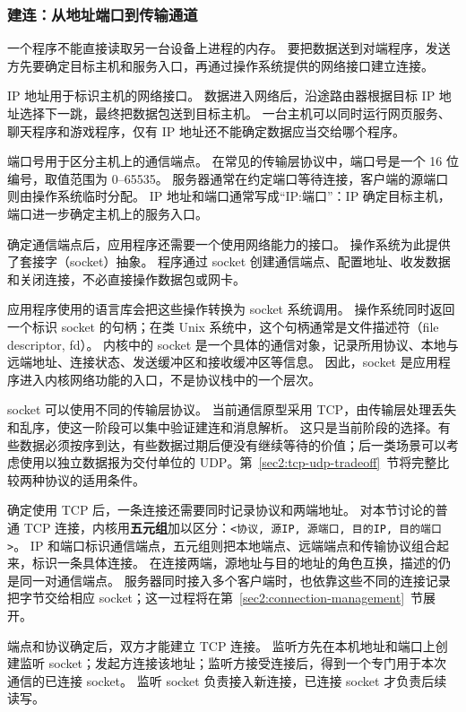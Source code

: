 \subsubsection{建连：从地址端口到传输通道}\label{sec2:connect-channel}

一个程序不能直接读取另一台设备上进程的内存。
要把数据送到对端程序，发送方先要确定目标主机和服务入口，再通过操作系统提供的网络接口建立连接。

IP 地址用于标识主机的网络接口。
数据进入网络后，沿途路由器根据目标 IP 地址选择下一跳，最终把数据包送到目标主机。
一台主机可以同时运行网页服务、聊天程序和游戏程序，仅有 IP 地址还不能确定数据应当交给哪个程序。

端口号用于区分主机上的通信端点。
在常见的传输层协议中，端口号是一个 16 位编号，取值范围为 0--65535。
服务器通常在约定端口等待连接，客户端的源端口则由操作系统临时分配。
IP 地址和端口通常写成“IP:端口”：IP 确定目标主机，端口进一步确定主机上的服务入口。

确定通信端点后，应用程序还需要一个使用网络能力的接口。
操作系统为此提供了套接字（socket）抽象。
程序通过 socket 创建通信端点、配置地址、收发数据和关闭连接，不必直接操作数据包或网卡。

应用程序使用的语言库会把这些操作转换为 socket 系统调用。
操作系统同时返回一个标识 socket 的句柄；在类 Unix 系统中，这个句柄通常是文件描述符（file descriptor, fd）。
内核中的 socket 是一个具体的通信对象，记录所用协议、本地与远端地址、连接状态、发送缓冲区和接收缓冲区等信息。
因此，socket 是应用程序进入内核网络功能的入口，不是协议栈中的一个层次。

socket 可以使用不同的传输层协议。
当前通信原型采用 TCP，由传输层处理丢失和乱序，使这一阶段可以集中验证建连和消息解析。
这只是当前阶段的选择。有些数据必须按序到达，有些数据过期后便没有继续等待的价值；后一类场景可以考虑使用以独立数据报为交付单位的 UDP。第~\ref{sec2:tcp-udp-tradeoff}~节将完整比较两种协议的适用条件。

确定使用 TCP 后，一条连接还需要同时记录协议和两端地址。
对本节讨论的普通 TCP 连接，内核用\textbf{五元组}加以区分：\texttt{<协议, 源IP, 源端口, 目的IP, 目的端口>}。
IP 和端口标识通信端点，五元组则把本地端点、远端端点和传输协议组合起来，标识一条具体连接。
在连接两端，源地址与目的地址的角色互换，描述的仍是同一对通信端点。
服务器同时接入多个客户端时，也依靠这些不同的连接记录把字节交给相应 socket；这一过程将在第~\ref{sec2:connection-management}~节展开。

端点和协议确定后，双方才能建立 TCP 连接。
监听方先在本机地址和端口上创建监听 socket；发起方连接该地址；监听方接受连接后，得到一个专门用于本次通信的已连接 socket。
监听 socket 负责接入新连接，已连接 socket 才负责后续读写。

